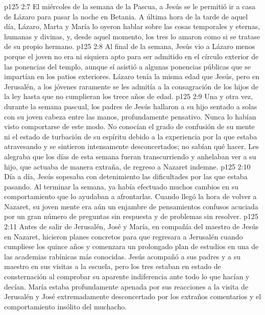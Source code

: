 \vs p125 2:7 El miércoles de la semana de la Pascua, a Jesús se le permitió ir a casa de Lázaro para pasar la noche en Betania. A última hora de la tarde de aquel día, Lázaro, Marta y María lo oyeron hablar sobre las cosas temporales y eternas, humanas y divinas, y, desde aquel momento, los tres lo amaron como si se tratase de su propio hermano.
\vs p125 2:8 Al final de la semana, Jesús vio a Lázaro menos porque el joven no era ni siquiera apto para ser admitido en el círculo exterior de las ponencias del templo, aunque sí asistió a algunas ponencias públicas que se impartían en los patios exteriores. Lázaro tenía la misma edad que Jesús, pero en Jerusalén, a los jóvenes raramente se les admitía a la consagración de los hijos de la ley hasta que no cumplieran los trece años de edad.
\vs p125 2:9 Una y otra vez, durante la semana pascual, los padres de Jesús hallaron a su hijo sentado a solas con su joven cabeza entre las manos, profundamente pensativo. Nunca lo habían visto comportarse de este modo. No conocían el grado de confusión de su mente ni el estado de turbación de su espíritu debido a la experiencia por la que estaba atravesando y se sintieron intensamente desconcertados; no sabían qué hacer. Les alegraba que los días de esta semana fueran transcurriendo y anhelaban ver a su hijo, que actuaba de manera extraña, de regreso a Nazaret indemne.
\vs p125 2:10 Día a día, Jesús sopesaba con detenimiento las dificultades por las que estaba pasando. Al terminar la semana, ya había efectuado muchos cambios en su comportamiento que lo ayudaban a afrontarlas. Cuando llegó la hora de volver a Nazaret, su joven mente era aún un enjambre de pensamientos confusos acuciada por un gran número de preguntas sin respuesta y de problemas sin resolver.
\vs p125 2:11 Antes de salir de Jerusalén, José y María, en compañía del maestro de Jesús en Nazaret, hicieron planes concretos para que regresara a Jerusalén cuando cumpliese los quince años y comenzara un prolongado plan de estudios en una de las academias rabínicas más conocidas. Jesús acompañó a sus padres y a su maestro en sus visitas a la escuela, pero los tres estaban en estado de consternación al comprobar su aparente indiferencia ante todo lo que hacían y decían. María estaba profundamente apenada por sus reacciones a la visita de Jerusalén y José extremadamente desconcertado por los extraños comentarios y el comportamiento insólito del muchacho.
